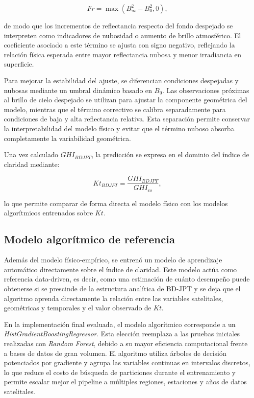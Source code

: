 \documentclass[../main.tex]{subfiles}
\begin{document}
\begin{equation}
Fr = \max(B_m^2 - B_0^2, 0),
\end{equation}

de modo que los incrementos de reflectancia respecto del fondo despejado se interpreten como indicadores de nubosidad o aumento de brillo atmosférico. El coeficiente asociado a este término se ajusta con signo negativo, reflejando la relación física esperada entre mayor reflectancia nubosa y menor irradiancia en superficie.

Para mejorar la estabilidad del ajuste, se diferencian condiciones despejadas y nubosas mediante un umbral dinámico basado en $B_0$. Las observaciones próximas al brillo de cielo despejado se utilizan para ajustar la componente geométrica del modelo, mientras que el término correctivo se calibra separadamente para condiciones de baja y alta reflectancia relativa. Esta separación permite conservar la interpretabilidad del modelo físico y evitar que el término nuboso absorba completamente la variabilidad geométrica.

Una vez calculado $GHI_{BDJPT}$, la predicción se expresa en el dominio del índice de claridad mediante:

\begin{equation}
Kt_{BDJPT} =
\frac{GHI_{BDJPT}}{GHI_{cs}},
\end{equation}

lo que permite comparar de forma directa el modelo físico con los modelos algorítmicos entrenados sobre $Kt$.

\subsection{Modelo algorítmico de referencia}

Además del modelo físico-empírico, se entrenó un modelo de aprendizaje automático directamente sobre el índice de claridad. Este modelo actúa como referencia data-driven, es decir, como una estimación de cuánto desempeño puede obtenerse si se prescinde de la estructura analítica de BD-JPT y se deja que el algoritmo aprenda directamente la relación entre las variables satelitales, geométricas y temporales y el valor observado de $Kt$.

En la implementación final evaluada, el modelo algorítmico corresponde a un \textit{HistGradientBoostingRegressor}. Esta elección reemplaza a las pruebas iniciales realizadas con \textit{Random Forest}, debido a su mayor eficiencia computacional frente a bases de datos de gran volumen. El algoritmo utiliza árboles de decisión potenciados por gradiente y agrupa las variables continuas en intervalos discretos, lo que reduce el costo de búsqueda de particiones durante el entrenamiento y permite escalar mejor el pipeline a múltiples regiones, estaciones y años de datos satelitales.
\end{document}
